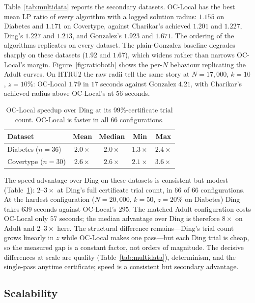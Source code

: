 \documentclass[twoside,leqno,twocolumn]{article}
\begin{document}
Table~\ref{tab:multidata} reports the secondary datasets. OC-Local has
the best mean LP ratio of every algorithm with a logged solution
radius: $1.155$ on Diabetes and $1.171$ on Covertype, against
Charikar's achieved $1.201$ and $1.227$, Ding's $1.227$ and $1.213$,
and Gonzalez's $1.923$ and $1.671$. The ordering of the algorithms
replicates on every dataset. The plain-Gonzalez baseline degrades
sharply on these datasets ($1.92$ and $1.67$), which widens rather
than narrows OC-Local's margin. Figure~\ref{fig:ratioboth} shows the
per-$N$ behaviour replicating the Adult curves. On HTRU2 the raw radii
tell the same story at $N=17{,}000$, $k=10$, $z=10\%$: OC-Local $1.79$
in $17$ seconds against Gonzalez $4.21$, with Charikar's achieved
radius above OC-Local's at $56$ seconds.

\begin{table}[t]
\caption{OC-Local speedup over Ding at its 99\%-certificate trial
count. OC-Local is faster in all 66 configurations.}
\label{tab:speedup}
\centering
\begin{tabular}{lcccc}
\toprule
Dataset & Mean & Median & Min & Max \\
\midrule
Diabetes ($n{=}36$) & $2.0\times$ & $2.0\times$ & $1.3\times$ & $2.4\times$ \\
Covertype ($n{=}30$) & $2.6\times$ & $2.6\times$ & $2.1\times$ & $3.6\times$ \\
\bottomrule
\end{tabular}
\end{table}

The speed advantage over Ding on these datasets is consistent but
modest (Table~\ref{tab:speedup}): $2$--$3\times$ at Ding's full
certificate trial count, in 66 of 66 configurations. At the hardest
configuration ($N=20{,}000$, $k=50$, $z=20\%$ on Diabetes) Ding takes
$639$ seconds against OC-Local's $295$. The matched Adult
configuration costs OC-Local only $57$ seconds; the median advantage
over Ding is therefore $8\times$ on Adult and $2$--$3\times$ here. The
structural difference remains---Ding's trial count grows linearly in
$z$ while OC-Local makes one pass---but each Ding trial is cheap, so
the measured gap is a constant factor, not orders of magnitude. The
decisive differences at scale are quality (Table~\ref{tab:multidata}),
determinism, and the single-pass anytime certificate; speed is a
consistent but secondary advantage.

\subsection{Scalability}
\label{sec:scalability}
\end{document}

